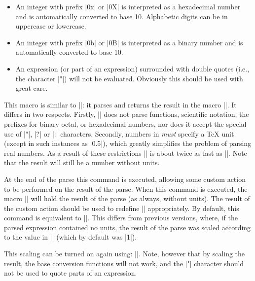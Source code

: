\begin{command}{\pgfmathparse{}}
\begin{itemize}
  \item
    An integer with prefix |0x| or |0X| is interpreted as a hexadecimal
    number and is automatically converted to base 10. Alphabetic digits
    can be in uppercase or lowercase.
    
  \item
    An integer with prefix |0b| or |0B| is interpreted as a binary
    number and is automatically converted to base 10.
    
  \item
    An expression (or part of an expression) surrounded with double
    quotes (i.e., the character |"|) will not be evaluated.
    Obviously this should be used with great care.
    
  \end{itemize}

\end{command}



\begin{command}{\pgfmathqparse{}}
  This macro is similar to |\pgfmathparse|: it parses
   and returns the result in the macro
  |\pgfmathresult|. It differs in two respects. Firstly,
  |\pgfmathqparse| does not parse functions, scientific
  notation, the prefixes for binary octal, or hexadecimal numbers,
  nor does it accept the special use of |"|, |?| or |:| characters.
  Secondly, numbers in  \emph{must}
  specify a \TeX{} unit (except in such instances as |0.5\pgf@x|),
  which greatly simplifies the problem of parsing real numbers.
  As a result of these restrictions |\pgfmathqparse|
  is about twice as fast as |\pgfmathparse|. Note that the result
  will still be a number without units.	
\end{command}

\begin{command}{\pgfmathpostparse}

  At the end of the parse this command is executed, allowing some
  custom action to be performed on the result of the parse. When this
  command is executed, the macro |\pgfmathresult| will hold the result
  of the parse (as always, without units). The result of the custom
  action should be used to redefine |\pgfmathresult| appropriately.
  By default, this command is equivalent to |\relax|. This differs
  from previous versions, where, if the parsed expression contained
  no units, the result of the parse was scaled according to the value
  in |\pgfmathresultunitscale| (which by default was |1|).

  This scaling can be  turned on again using:
  |\let\pgfmathpostparse=\pgfmathscaleresult|.
  Note, however that by scaling the result, the base conversion
  functions will not work, and the |"| character should not be
  used to quote parts of an expression.

\end{command}

